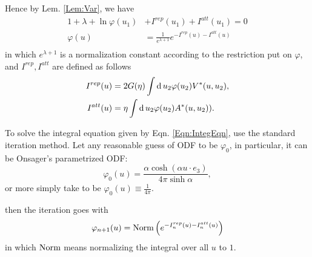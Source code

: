 Hence by Lem. \ref{Lem:Var}, we have
\begin{equation}\label{Eqn:IntegEqn}
	\begin{split}
		1+\lambda+\ln \varphi(u_1)&+I^{rep}(u_1)+I^{att}(u_1)=0\\
		\varphi(u)&=\frac{1}{e^{\lambda+1}}e^{-I^{rep}(u)-I^{att}(u)}\\
	\end{split}
\end{equation}
in which $e^{\lambda+1}$ is a normalization constant according to the restriction put on $\varphi$, and $I^{rep}, I^{att}$ are defined as follows
\begin{equation}
	\begin{split}
		I^{rep}(u)&=2G(\eta)\int\operatorname{d}u_2\varphi(u_2)V^*(u,u_2),\\
		I^{att}(u)&=\eta\int\operatorname{d}u_2\varphi(u_2)A^*(u,u_2)).
	\end{split}
\end{equation}

To solve the integral equation given by Eqn. \ref{Eqn:IntegEqn}, use the standard iteration method. Let any reasonable guess of ODF to be $\varphi_0$, in particular, it can be Onsager's parametrized ODF:
\begin{equation}
	\varphi_0(u) = \frac{\alpha\cosh(\alpha u\cdot e_3)}{4\pi\sinh\alpha},
\end{equation}
or more simply take to be $\varphi_0(u)\equiv\frac{1}{4\pi}$.

then the iteration goes with
\begin{equation}
	\varphi_{n+1}(u)=\operatorname{Norm}\left(e^{-I_n^{rep}(u)-I_n^{att}(u)}\right)
\end{equation}
in which $\operatorname{Norm}$ means normalizing the integral over all $u$ to $1$.



